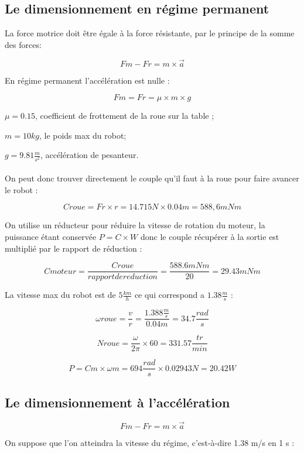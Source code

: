 \subsection{Le dimensionnement en régime permanent}
La force motrice doit être égale à la force résistante, par le principe de la somme des forces:

$$Fm - Fr = m \times \overrightarrow{a}$$

En régime permanent l’accélération est nulle :

$$Fm = Fr = \mu \times m \times g$$

$\mu = 0.15$, coefficient de frottement de la roue sur la table ;

$m = 10 kg$, le poids max du robot;

$g = 9.81 \frac{m}{s^{2}}$, accélération de pesanteur.

\paragraph{}
On peut donc trouver directement le couple qu’il faut à la roue pour faire avancer le robot :

$$Croue = Fr \times r = 14.715N \times 0.04m = 588,6 mNm$$

On utilise un réducteur pour réduire la vitesse de rotation du moteur,  la puissance étant conservée $P = C \times W$ donc le couple récupérer à la sortie est multiplié  par le rapport de réduction :

$$Cmoteur= \frac {Croue}{rapport de reduction} = \frac {588.6 mNm} {20} = 29.43 mNm$$

La vitesse max du robot est de $5 \frac{km}{h}$ ce qui correspond a $1.38 \frac{m}{s}$ :

$$\omega roue = \frac{v}{r}= \frac{1.388 \frac{m}{s}}{0.04m}= 34.7 \frac{rad}{s} $$

$$Nroue = \frac {\omega} {2 \pi } \times 60 = 331.57 \frac {tr}{min}$$

$$P = Cm \times \omega m = 694 \frac {rad}{s}  \times 0.02943 N = 20.42 W$$
   
\subsection{Le dimensionnement à l'accélération}
$$Fm - Fr = m \times \overrightarrow{a}$$

On suppose que l'on atteindra la vitesse du régime, c’est-à-dire 1.38 m/s en 1 s :


